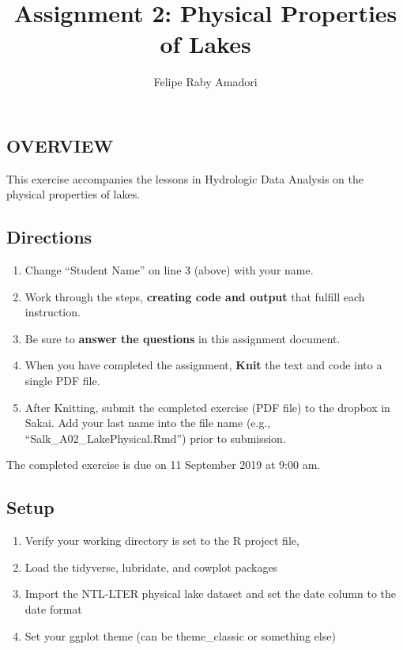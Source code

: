 \documentclass[]{article}
\title{Assignment 2: Physical Properties of Lakes}
\author{Felipe Raby Amadori}
\date{}
\providecommand{\tightlist}{%
  \setlength{\itemsep}{0pt}\setlength{\parskip}{0pt}}
\begin{document}
\maketitle

\hypertarget{overview}{%
\subsection{OVERVIEW}\label{overview}}

This exercise accompanies the lessons in Hydrologic Data Analysis on the
physical properties of lakes.

\hypertarget{directions}{%
\subsection{Directions}\label{directions}}

\begin{enumerate}
\def\labelenumi{\arabic{enumi}.}
\tightlist
\item
  Change ``Student Name'' on line 3 (above) with your name.
\item
  Work through the steps, \textbf{creating code and output} that fulfill
  each instruction.
\item
  Be sure to \textbf{answer the questions} in this assignment document.
\item
  When you have completed the assignment, \textbf{Knit} the text and
  code into a single PDF file.
\item
  After Knitting, submit the completed exercise (PDF file) to the
  dropbox in Sakai. Add your last name into the file name (e.g.,
  ``Salk\_A02\_LakePhysical.Rmd'') prior to submission.
\end{enumerate}

The completed exercise is due on 11 September 2019 at 9:00 am.

\hypertarget{setup}{%
\subsection{Setup}\label{setup}}

\begin{enumerate}
\def\labelenumi{\arabic{enumi}.}
\tightlist
\item
  Verify your working directory is set to the R project file,
\item
  Load the tidyverse, lubridate, and cowplot packages
\item
  Import the NTL-LTER physical lake dataset and set the date column to
  the date format
\item
  Set your ggplot theme (can be theme\_classic or something else)
\end{enumerate}
\end{document}
